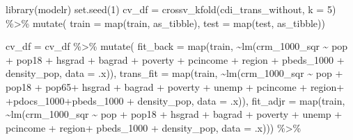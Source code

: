 \documentclass[
]{article}
\newenvironment{Shaded}{\begin{snugshade}}{\end{snugshade}}
\newcommand{\AttributeTok}[1]{\textcolor[rgb]{0.77,0.63,0.00}{#1}}
\newcommand{\DecValTok}[1]{\textcolor[rgb]{0.00,0.00,0.81}{#1}}
\newcommand{\FunctionTok}[1]{\textcolor[rgb]{0.00,0.00,0.00}{#1}}
\newcommand{\NormalTok}[1]{#1}
\newcommand{\OtherTok}[1]{\textcolor[rgb]{0.56,0.35,0.01}{#1}}
\newcommand{\SpecialCharTok}[1]{\textcolor[rgb]{0.00,0.00,0.00}{#1}}
\begin{document}
\begin{Shaded}
\begin{Highlighting}[]
\FunctionTok{library}\NormalTok{(modelr)}
\FunctionTok{set.seed}\NormalTok{(}\DecValTok{1}\NormalTok{)}
\NormalTok{cv\_df }\OtherTok{=} 
  \FunctionTok{crossv\_kfold}\NormalTok{(cdi\_trans\_without, }\AttributeTok{k =} \DecValTok{5}\NormalTok{) }\SpecialCharTok{\%\textgreater{}\%} 
  \FunctionTok{mutate}\NormalTok{(}
    \AttributeTok{train =} \FunctionTok{map}\NormalTok{(train, as\_tibble),}
    \AttributeTok{test =} \FunctionTok{map}\NormalTok{(test, as\_tibble))}

\NormalTok{cv\_df }\OtherTok{=} 
\NormalTok{  cv\_df }\SpecialCharTok{\%\textgreater{}\%}
  \FunctionTok{mutate}\NormalTok{(}
    \AttributeTok{fit\_back =} \FunctionTok{map}\NormalTok{(train, }\SpecialCharTok{\textasciitilde{}}\FunctionTok{lm}\NormalTok{(crm\_1000\_sqr }\SpecialCharTok{\textasciitilde{}}\NormalTok{ pop }\SpecialCharTok{+}\NormalTok{ pop18 }\SpecialCharTok{+}\NormalTok{ hsgrad }\SpecialCharTok{+}\NormalTok{ bagrad }\SpecialCharTok{+}\NormalTok{ poverty }\SpecialCharTok{+}\NormalTok{ pcincome }\SpecialCharTok{+}\NormalTok{ region }\SpecialCharTok{+}\NormalTok{ pbeds\_1000 }\SpecialCharTok{+}\NormalTok{ density\_pop, }\AttributeTok{data =}\NormalTok{ .x)),}
    \AttributeTok{trans\_fit =} \FunctionTok{map}\NormalTok{(train, }\SpecialCharTok{\textasciitilde{}}\FunctionTok{lm}\NormalTok{(crm\_1000\_sqr }\SpecialCharTok{\textasciitilde{}}\NormalTok{ pop }\SpecialCharTok{+}\NormalTok{ pop18 }\SpecialCharTok{+}\NormalTok{ pop65}\SpecialCharTok{+}\NormalTok{ hsgrad }\SpecialCharTok{+}\NormalTok{ bagrad }\SpecialCharTok{+}\NormalTok{ poverty }\SpecialCharTok{+}\NormalTok{ unemp }\SpecialCharTok{+}\NormalTok{ pcincome }\SpecialCharTok{+}\NormalTok{ region}\SpecialCharTok{+} \SpecialCharTok{+}\NormalTok{pdocs\_1000}\SpecialCharTok{+}\NormalTok{pbeds\_1000 }\SpecialCharTok{+}\NormalTok{ density\_pop, }\AttributeTok{data =}\NormalTok{ .x)),}
    \AttributeTok{fit\_adjr =} \FunctionTok{map}\NormalTok{(train, }\SpecialCharTok{\textasciitilde{}}\FunctionTok{lm}\NormalTok{(crm\_1000\_sqr }\SpecialCharTok{\textasciitilde{}}\NormalTok{ pop }\SpecialCharTok{+}\NormalTok{ pop18 }\SpecialCharTok{+}\NormalTok{ hsgrad }\SpecialCharTok{+}\NormalTok{ bagrad }\SpecialCharTok{+}\NormalTok{ poverty }\SpecialCharTok{+}\NormalTok{ unemp }\SpecialCharTok{+}\NormalTok{ pcincome }\SpecialCharTok{+}\NormalTok{ region}\SpecialCharTok{+}\NormalTok{ pbeds\_1000 }\SpecialCharTok{+}\NormalTok{ density\_pop, }\AttributeTok{data =}\NormalTok{ .x))) }\SpecialCharTok{\%\textgreater{}\%} 

\end{Highlighting}
\end{Shaded}
\end{document}
